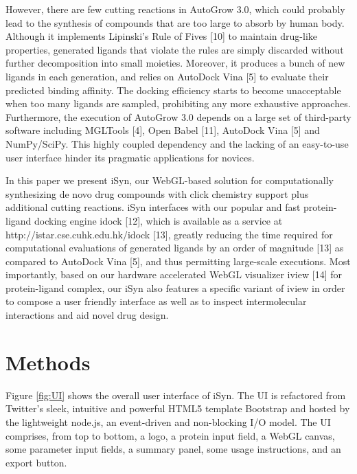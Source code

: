 However, there are few cutting reactions in AutoGrow 3.0, which could probably lead to the synthesis of compounds that are too large to absorb by human body. Although it implements Lipinski's Rule of Fives [10] to maintain drug-like properties, generated ligands that violate the rules are simply discarded without further decomposition into small moieties. Moreover, it produces a bunch of new ligands in each generation, and relies on AutoDock Vina [5] to evaluate their predicted binding affinity. The docking efficiency starts to become unacceptable when too many ligands are sampled, prohibiting any more exhaustive approaches. Furthermore, the execution of AutoGrow 3.0 depends on a large set of third-party software including MGLTools [4], Open Babel [11], AutoDock Vina [5] and NumPy/SciPy. This highly coupled dependency and the lacking of an easy-to-use user interface hinder its pragmatic applications for novices.

In this paper we present iSyn, our WebGL-based solution for computationally synthesizing de novo drug compounds with click chemistry support plus additional cutting reactions. iSyn interfaces with our popular and fast protein-ligand docking engine idock [12], which is available as a service at http://istar.cse.cuhk.edu.hk/idock [13], greatly reducing the time required for computational evaluations of generated ligands by an order of magnitude [13] as compared to AutoDock Vina [5], and thus permitting large-scale executions. Most importantly, based on our hardware accelerated WebGL visualizer iview [14] for protein-ligand complex, our iSyn also features a specific variant of iview in order to compose a user friendly interface as well as to inspect intermolecular interactions and aid novel drug design.

\section{Methods}

Figure \ref{fig:UI} shows the overall user interface of iSyn. The UI is refactored from Twitter’s sleek, intuitive and powerful HTML5 template Bootstrap and hosted by the lightweight node.js, an event-driven and non-blocking I/O model. The UI comprises, from top to bottom, a logo, a protein input field, a WebGL canvas, some parameter input fields, a summary panel, some usage instructions, and an export button.

